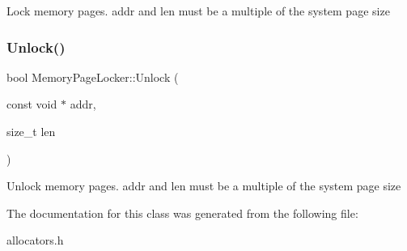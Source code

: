 Lock memory pages. addr and len must be a multiple of the system page size \mbox{\label{class_memory_page_locker_af9e9ad0edadcd8250db05f95cd6a49a7}} 
\subsubsection{\texorpdfstring{Unlock()}{Unlock()}}
{\footnotesize\ttfamily bool Memory\+Page\+Locker\+::\+Unlock (\begin{DoxyParamCaption}\item[{const void $\ast$}]{addr,  }\item[{size\+\_\+t}]{len }\end{DoxyParamCaption})\hspace{0.3cm}{\ttfamily [inline]}}

Unlock memory pages. addr and len must be a multiple of the system page size 

The documentation for this class was generated from the following file\+:\begin{DoxyCompactItemize}
\item 
allocators.\+h\end{DoxyCompactItemize}
